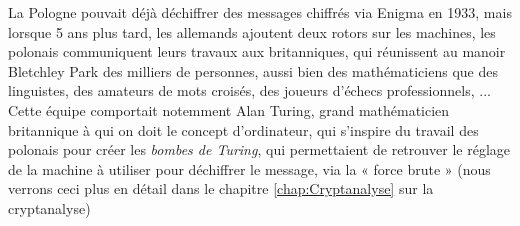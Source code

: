 La Pologne pouvait déjà déchiffrer des messages chiffrés via Enigma en
1933, mais lorsque 5 ans plus tard, les allemands ajoutent deux rotors
sur les machines, les polonais communiquent leurs travaux aux
britanniques, qui réunissent au manoir Bletchley Park des milliers de
personnes, aussi bien des mathématiciens que des linguistes, des
amateurs de mots croisés, des joueurs d'échecs professionnels, ...
Cette équipe comportait notemment Alan Turing, grand mathématicien
britannique à qui on doit le concept d'ordinateur, qui s'inspire du
travail des polonais pour créer les \emph{bombes de Turing}, qui
permettaient de retrouver le réglage de la machine à utiliser pour
déchiffrer le message, via la « force brute » (nous verrons ceci plus
en détail dans le chapitre \ref{chap:Cryptanalyse} sur la
cryptanalyse) \\

